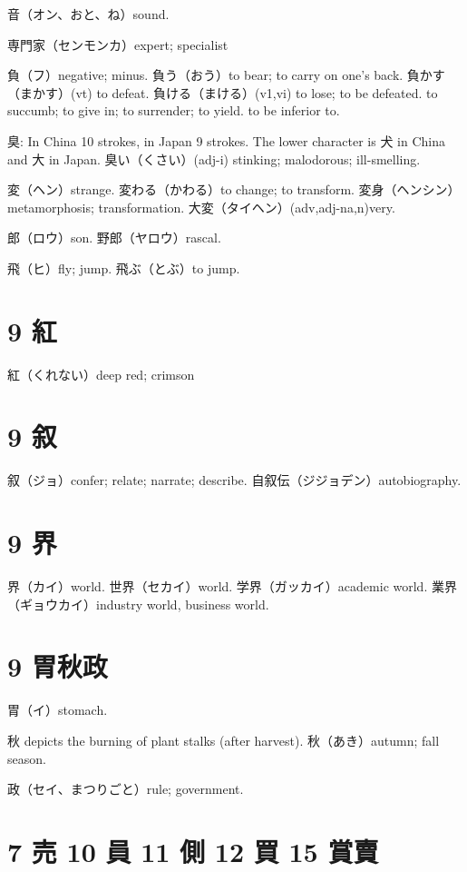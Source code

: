 音（オン、おと、ね）sound.

専門家（センモンカ）expert; specialist

負（フ）negative; minus.
負う（おう）to bear; to carry on one's back.
負かす（まかす）(vt) to defeat.
負ける（まける）(v1,vi)
to lose; to be defeated.
to succumb; to give in; to surrender; to yield.
to be inferior to.

臭: In China 10 strokes, in Japan 9 strokes.
The lower character is 犬 in China and 大 in Japan.
臭い（くさい）(adj-i) stinking; malodorous; ill-smelling.

変（ヘン）strange.
変わる（かわる）to change; to transform.
変身（ヘンシン）metamorphosis; transformation.
大変（タイヘン）(adv,adj-na,n)very.

郎（ロウ）son.
野郎（ヤロウ）rascal.

飛（ヒ）fly; jump.
飛ぶ（とぶ）to jump.

\section{9 紅}

紅（くれない）deep red; crimson

\section{9 叙}

叙（ジョ）confer; relate; narrate; describe.
自叙伝（ジジョデン）autobiography.

\section{9 界}

界（カイ）world.
世界（セカイ）world.
学界（ガッカイ）academic world.
業界（ギョウカイ）industry world, business world.

\section{9 胃秋政}

胃（イ）stomach.

秋 depicts the burning of plant stalks (after harvest).
秋（あき）autumn; fall season.

政（セイ、まつりごと）rule; government.

\section{7 売 10 員 11 側 12 買 15 賞賣}

